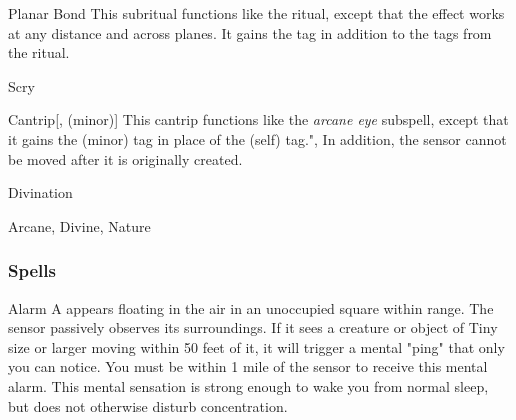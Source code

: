 \begin{ability}[\nth{7}]{Planar Bond}
This subritual functions like the  ritual, except that the effect works at any distance and across planes.
It gains the  tag in addition to the tags from the  ritual.
\end{ability}
\vspace{0.25em}


\newpage
\begin{spellsection}{Scry}

\begin{spellheader}
\end{spellheader}


\begin{ability}{Cantrip}[,  (minor)]
This cantrip functions like the \textit{arcane eye} subspell, except that it gains the  (minor) tag in place of the  (self) tag.",
In addition, the sensor cannot be moved after it is originally created.
\end{ability}




 Divination

 Arcane, Divine, Nature
\end{spellsection}


\subsubsection{Spells}


\begin{ability}[\nth{1}]{Alarm}
A  appears floating in the air in an unoccupied square within \rngmed range.
The sensor passively observes its surroundings.
If it sees a creature or object of Tiny size or larger moving within 50 feet of it, it will trigger a mental "ping" that only you can notice.
You must be within 1 mile of the sensor to receive this mental alarm.
This mental sensation is strong enough to wake you from normal sleep, but does not otherwise disturb concentration.
\end{ability}
\vspace{0.25em}




